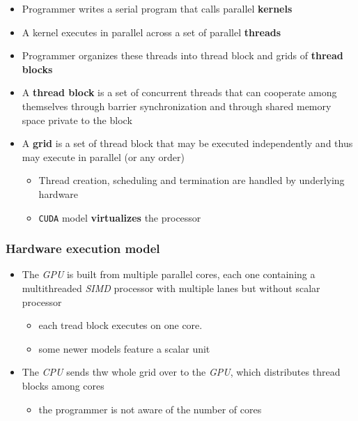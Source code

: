 \documentclass[english]{article}
\begin{document}
\begin{itemize}
  \item Programmer writes a serial program that calls parallel \textbf{kernels}
  \item A kernel executes in parallel across a set of parallel \textbf{threads}
  \item Programmer organizes these threads into thread block and grids of \textbf{thread blocks}
  \item A \textbf{thread block} is a set of concurrent threads that can cooperate among themselves through barrier synchronization and through shared memory space private to the block
  \item A \textbf{grid} is a set of thread block that may be executed independently and thus may execute in parallel (or any order)
        \begin{itemize}
          \item Thread creation, scheduling and termination are handled by underlying hardware
          \item \texttt{CUDA} model \textbf{virtualizes} the processor
        \end{itemize}
\end{itemize}

\subsubsection{Hardware execution model}

\begin{itemize}
  \item The \textit{GPU} is built from multiple parallel cores, each one containing a multithreaded \textit{SIMD} processor with multiple lanes but without scalar processor
        \begin{itemize}
          \item each tread block executes on one core.
          \item some newer models feature a scalar unit
        \end{itemize}
  \item The \textit{CPU} sends thw whole grid over to the \textit{GPU}, which distributes thread blocks among cores
        \begin{itemize}
          \item the programmer is not aware of the number of cores
        \end{itemize}
\end{itemize}
\end{document}
